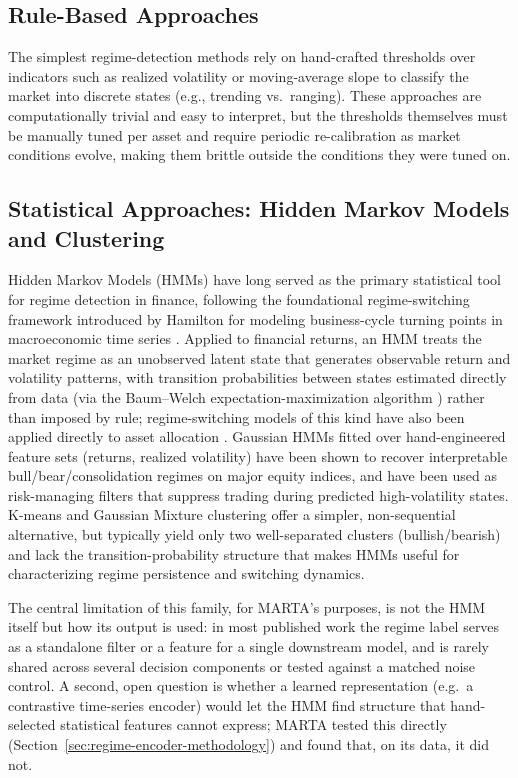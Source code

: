 \subsection{Rule-Based Approaches}
\label{subsec:regime-rule-based}

The simplest regime-detection methods rely on hand-crafted thresholds over indicators such as realized volatility or moving-average slope to classify the market into discrete states (e.g., trending vs.\ ranging). These approaches are computationally trivial and easy to interpret, but the thresholds themselves must be manually tuned per asset and require periodic re-calibration as market conditions evolve, making them brittle outside the conditions they were tuned on.

\subsection{Statistical Approaches: Hidden Markov Models and Clustering}
\label{subsec:regime-statistical}

Hidden Markov Models (HMMs) have long served as the primary statistical tool for regime detection in finance, following the foundational regime-switching framework introduced by Hamilton for modeling business-cycle turning points in macroeconomic time series \cite{hamilton1989}. Applied to financial returns, an HMM treats the market regime as an unobserved latent state that generates observable return and volatility patterns, with transition probabilities between states estimated directly from data (via the Baum--Welch expectation-maximization algorithm \cite{baum1970,rabiner1989}) rather than imposed by rule; regime-switching models of this kind have also been applied directly to asset allocation \cite{angbekaert2002}. Gaussian HMMs fitted over hand-engineered feature sets (returns, realized volatility) have been shown to recover interpretable bull/bear/consolidation regimes on major equity indices, and have been used as risk-managing filters that suppress trading during predicted high-volatility states. K-means and Gaussian Mixture clustering offer a simpler, non-sequential alternative, but typically yield only two well-separated clusters (bullish/bearish) and lack the transition-probability structure that makes HMMs useful for characterizing regime persistence and switching dynamics.

The central limitation of this family, for MARTA's purposes, is not the HMM itself but how its output is used: in most published work the regime label serves as a standalone filter or a feature for a single downstream model, and is rarely shared across several decision components or tested against a matched noise control. A second, open question is whether a learned representation (e.g.\ a contrastive time-series encoder) would let the HMM find structure that hand-selected statistical features cannot express; MARTA tested this directly (Section~\ref{sec:regime-encoder-methodology}) and found that, on its data, it did not.

